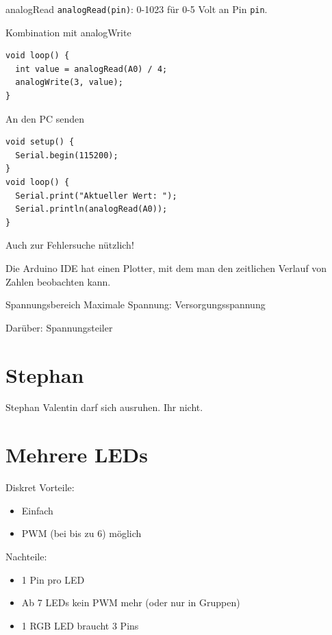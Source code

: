 \documentclass[bigger]{beamer}
\begin{document}
\begin{frame}[fragile,label={sec:orgc336c10}]{analogRead}
 \texttt{analogRead(pin)}: 0-1023 für 0-5 Volt an Pin \texttt{pin}.
\end{frame}

\begin{frame}[fragile,label={sec:org7c4a210}]{Kombination mit analogWrite}
 \begin{verbatim}
void loop() {
  int value = analogRead(A0) / 4;
  analogWrite(3, value);
}
\end{verbatim}
\end{frame}

\begin{frame}[fragile,label={sec:org4d66d98}]{An den PC senden}
 \begin{verbatim}
void setup() {
  Serial.begin(115200);
}
void loop() {
  Serial.print("Aktueller Wert: ");
  Serial.println(analogRead(A0));
}
\end{verbatim}

Auch zur Fehlersuche nützlich!

Die Arduino IDE hat einen Plotter, mit dem man den zeitlichen Verlauf
von Zahlen beobachten kann.
\end{frame}

\begin{frame}[label={sec:orgfdd0242}]{Spannungsbereich}
Maximale Spannung: Versorgungsspannung
\pause

Darüber: Spannungsteiler
\end{frame}

\section{Stephan}
\label{sec:orgd3be8cf}
\begin{frame}[label={sec:org0be679a}]{Stephan}
Valentin darf sich ausruhen. Ihr nicht.
\end{frame}

\section{Mehrere LEDs}
\label{sec:org4a19b30}
\begin{frame}[label={sec:org78c6ac9}]{Diskret}
Vorteile:
\begin{itemize}
\item Einfach
\item PWM (bei bis zu 6) möglich
\end{itemize}

Nachteile:
\begin{itemize}
\item 1 Pin pro LED
\item Ab 7 LEDs kein PWM mehr (oder nur in Gruppen)
\item 1 RGB LED braucht 3 Pins
\end{itemize}
\end{frame}
\end{document}
